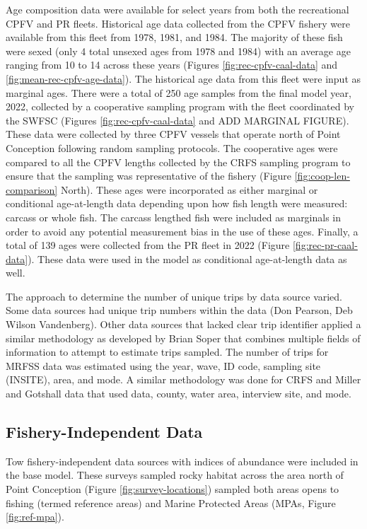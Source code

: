 \documentclass[11pt,
  english,
  letterpaper,
]{article}
\begin{document}
Age composition data were available for select years from both the recreational CPFV and PR fleets. Historical age data collected from the CPFV fishery were available from this fleet from 1978, 1981, and 1984. The majority of these fish were sexed (only 4 total unsexed ages from 1978 and 1984) with an average age ranging from 10 to 14 across these years (Figures \ref{fig:rec-cpfv-caal-data} and \ref{fig:mean-rec-cpfv-age-data}). The historical age data from this fleet were input as marginal ages. There were a total of 250 age samples from the final model year, 2022, collected by a cooperative sampling program with the fleet coordinated by the SWFSC (Figures \ref{fig:rec-cpfv-caal-data} and ADD MARGINAL FIGURE). These data were collected by three CPFV vessels that operate north of Point Conception following random sampling protocols. The cooperative ages were compared to all the CPFV lengths collected by the CRFS sampling program to ensure that the sampling was representative of the fishery (Figure \ref{fig:coop-len-comparison} North). These ages were incorporated as either marginal or conditional age-at-length data depending upon how fish length were measured: carcass or whole fish. The carcass lengthed fish were included as marginals in order to avoid any potential measurement bias in the use of these ages. Finally, a total of 139 ages were collected from the PR fleet in 2022 (Figure \ref{fig:rec-pr-caal-data}). These data were used in the model as conditional age-at-length data as well.

The approach to determine the number of unique trips by data source varied. Some data sources had unique trip numbers within the data (Don Pearson, Deb Wilson Vandenberg). Other data sources that lacked clear trip identifier applied a similar methodology as developed by Brian Soper that combines multiple fields of information to attempt to estimate trips sampled. The number of trips for MRFSS data was estimated using the year, wave, ID code, sampling site (INSITE), area, and mode. A similar methodology was done for CRFS and Miller and Gotshall data that used data, county, water area, interview site, and mode.

\hypertarget{fishery-independent-data}{%
\subsection{Fishery-Independent Data}\label{fishery-independent-data}}

\hfill\break

Tow fishery-independent data sources with indices of abundance were included in the base model. These surveys sampled rocky habitat across the area north of Point Conception (Figure \ref{fig:survey-locations}) sampled both areas opens to fishing (termed reference areas) and Marine Protected Areas (MPAs, Figure \ref{fig:ref-mpa}).
\end{document}
